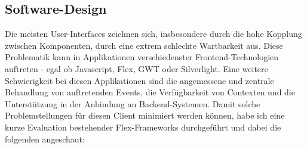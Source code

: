 \subsection{Software-Design}
Die meisten User-Interfaces zeichnen sich, insbesondere durch die hohe Kopplung zwischen Komponenten, durch eine extrem schlechte Wartbarkeit aus. Diese Problematik kann in Applikationen verschiedenster Frontend-Technologien auftreten - egal ob Javascript, Flex, GWT oder Silverlight. Eine weitere Schwierigkeit bei diesen Applikationen sind die angemessene und zentrale Behandlung von auftretenden Events, die Verf\"ugbarkeit von Contexten und die Unterst\"utzung in der Anbindung an Backend-Systemen. Damit solche Problemstellungen f\"ur diesen Client minimiert werden k\"onnen, habe ich eine kurze Evaluation bestehender Flex-Frameworks durchgef\"uhrt und dabei die folgenden angeschaut:
